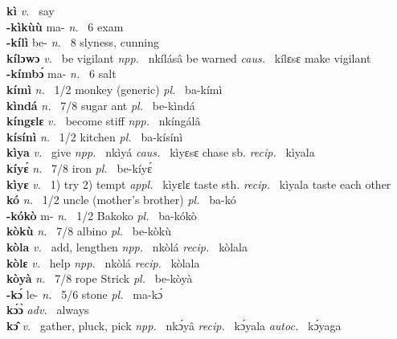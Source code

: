 {\bfseries kì}  {\itshape v.~} say    \\ 
{\bfseries -kìkùù} ma- {\itshape n.~} 6 exam    \\ 
{\bfseries -kílì} be- {\itshape n.~} 8 slyness, cunning    \\ 
{\bfseries kílɔwɔ}  {\itshape v.~} be vigilant   {\itshape npp.~} nkílásâ be warned {\itshape caus.~} kílɛsɛ make vigilant  \\ 
{\bfseries -kímbɔ́} ma- {\itshape n.~} 6 salt    \\ 
{\bfseries kímì}  {\itshape n.~} 1/2 monkey (generic) {\itshape pl.~} ba-kímì    \\ 
{\bfseries kìndá}  {\itshape n.~} 7/8 sugar ant {\itshape pl.~} be-kìndá    \\ 
{\bfseries kíngɛlɛ}  {\itshape v.~} become stiff   {\itshape npp.~} nkíngálâ  \\ 
{\bfseries kísínì}  {\itshape n.~} 1/2 kitchen {\itshape pl.~} ba-kísínì    \\ 
{\bfseries kìya}  {\itshape v.~} give {\itshape npp.~} nkìyá {\itshape caus.~} kìyɛsɛ chase sb. {\itshape recip.~} kìyala  \\ 
{\bfseries kíyɛ́}  {\itshape n.~} 7/8 iron {\itshape pl.~} be-kíyɛ́    \\ 
{\bfseries kìyɛ}  {\itshape v.~} 1) try 2) tempt  {\itshape appl.~} kìyɛlɛ taste sth. {\itshape recip.~} kìyala taste each other  \\ 
{\bfseries kó}  {\itshape n.~} 1/2 uncle (mother's brother) {\itshape pl.~} ba-kó    \\ 
{\bfseries -kókò} m- {\itshape n.~} 1/2 Bakoko {\itshape pl.~} ba-kókò   \\ 
{\bfseries kòkù}  {\itshape n.~} 7/8 albino {\itshape pl.~} be-kòkù    \\ 
{\bfseries kòla}  {\itshape v.~} add, lengthen   {\itshape npp.~} nkòlá {\itshape recip.~} kòlala  \\ 
{\bfseries kòlɛ}  {\itshape v.~} help   {\itshape npp.~} nkòlá {\itshape recip.~} kòlala  \\
{\bfseries kòyà}  {\itshape n.~} 7/8 rope Strick {\itshape pl.~} be-kòyà    \\ 
{\bfseries -kɔ́} le- {\itshape n.~} 5/6 stone {\itshape pl.~} ma-kɔ́    \\ 
{\bfseries kɔ́ɔ̀}  {\itshape adv.~} always    \\ 
{\bfseries kɔ̂}  {\itshape v.~} gather, pluck, pick   {\itshape npp.~} nkɔ́yâ {\itshape recip.~} kɔ́yala {\itshape autoc.~} kɔ́yaga  \\ 
